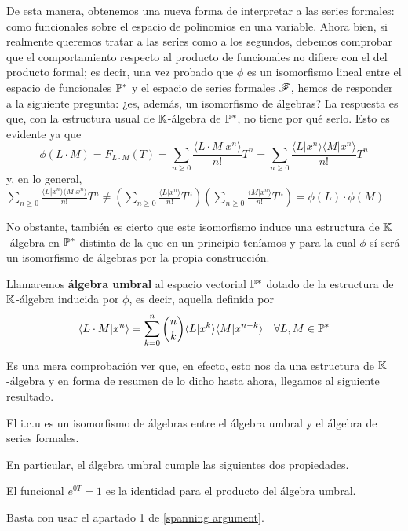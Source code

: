 De esta manera, obtenemos una nueva forma de interpretar a las series formales: como funcionales sobre el espacio de polinomios en una variable. Ahora bien, si realmente queremos tratar a las series como a los segundos, debemos comprobar que el comportamiento respecto al producto de funcionales no difiere con el del producto formal; es decir, una vez probado que $\phi$ es un isomorfismo lineal entre el espacio de funcionales $\mathbb{P}^*$ y el espacio de series formales $\mathscr{F}$, hemos de responder a la siguiente pregunta: ¿es, además, un isomorfismo de álgebras? La respuesta es que, con la estructura usual de $\mathbb{K}$-álgebra de $\mathbb{P}^*$, no tiene por qué serlo. Esto es evidente ya que
\begin{equation*}
    \phi(L \cdot M) = F_{L \cdot M}(T) = \sum_{n\geq0} \frac{ \langle L \cdot M | x^n \rangle}{n!} T^n = \sum_{n\geq0} \frac{ \langle L | x^n \rangle \langle M | x^n \rangle}{n!} T^n
\end{equation*}
y, en lo general, $\sum_{n\geq0} \frac{ \langle L | x^n \rangle \langle M | x^n \rangle}{n!} T^n \neq (\sum_{n\geq0} \frac{ \langle L | x^n \rangle}{n!} T^n) (\sum_{n\geq0} \frac{ \langle M | x^n \rangle}{n!} T^n) = \phi(L) \cdot \phi(M)$

No obstante, también es cierto que este isomorfismo induce una estructura de $\mathbb{K}$-álgebra en $\mathbb{P}^*$ distinta de la que en un principio teníamos y para la cual $\phi$ sí será un isomorfismo de álgebras por la propia construcción.

\begin{definicion}
    Llamaremos \textbf{álgebra umbral} al espacio vectorial $\mathbb{P}^*$ dotado de la estructura de $\mathbb{K}$-álgebra inducida por $\phi$, es decir, aquella definida por
    \begin{equation}\label{producto funcionales}
        \langle L \cdot M | x^n \rangle = \sum_{k=0}^n\binom{n}{k}\langle L | x^k \rangle \langle M | x^{n-k} \rangle \quad \forall L, M \in \mathbb{P}^*
    \end{equation}
\end{definicion}
Es una mera comprobación ver que, en efecto, esto nos da una estructura de $\mathbb{K}$-álgebra y en forma de resumen de lo dicho hasta ahora, llegamos al siguiente resultado.

\begin{corolario}
    El i.c.u es un isomorfismo de álgebras entre el álgebra umbral y el álgebra de series formales.
\end{corolario}

En particular, el álgebra umbral cumple las siguientes dos propiedades.
\begin{proposicion}\label{identidad algebra umbral}
    El funcional $e^{0T} = 1$ es la identidad para el producto del álgebra umbral.
\end{proposicion}
\begin{demo}
    Basta con usar el apartado 1 de \ref{spanning argument}.
\end{demo}

